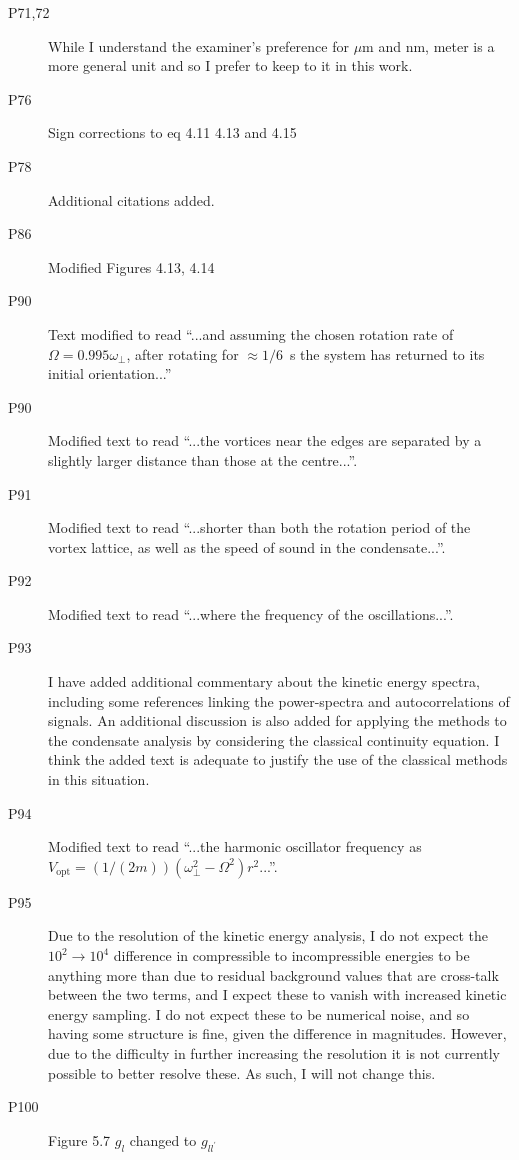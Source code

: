 \documentclass[paper=a4, fontsize=12pt]{scrartcl}
\begin{document}
\begin{description}
    \item [P71,72] While I understand the examiner's preference for $\mu$m and nm, meter is a more general unit and so I prefer to keep to it in this work.
    \item [P76] Sign corrections to eq 4.11 4.13 and 4.15
    \item [P78] Additional citations added.
    \item [P86] Modified Figures 4.13, 4.14
    \item [P90] Text modified to read ``...and assuming the chosen rotation rate of $\Omega = 0.995\omega_\perp$, after rotating for
    $ \approx 1/6$\ s the system has returned to its initial orientation...''
    \item [P90] Modified text to read ``...the vortices near the edges are separated by a slightly larger distance than those at the centre...''.
    \item [P91] Modified text to read ``...shorter than both the rotation period of the vortex lattice, as well as the speed of sound in the condensate...''.
    \item [P92] Modified text to read ``...where the frequency of the oscillations...''.
    \item [P93] I have added additional commentary about the kinetic energy spectra, including some references linking the power-spectra and autocorrelations of signals. An additional discussion is also added for applying the methods to the condensate analysis by considering the classical continuity equation. I think the added text is adequate to justify the use of the classical methods in this situation.
    \item [P94] Modified text to read ``...the harmonic oscillator frequency  as $V_{\text{opt}} = (1/(2m))(\omega^2_\perp - \Omega^2)
    {r}^2$...''.
    \item [P95] Due to the resolution of the kinetic energy analysis, I do not expect the $10^2 \to 10^4$ difference in compressible to incompressible energies to be anything more than due to residual background values that are cross-talk between the two terms, and I expect these to vanish with increased kinetic energy sampling. I do not expect these to be numerical noise, and so having some structure is fine, given the difference in magnitudes. However, due to the difficulty in further increasing the resolution it is not currently possible to better resolve these. As such, I will not change this.
    \item [P100] Figure 5.7 $g_l$ changed to $g_{ll^\prime}$

\end{description}
\end{document}
